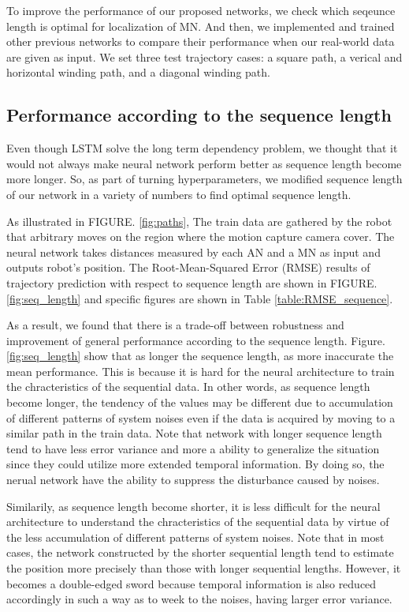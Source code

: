 \documentclass[letterpaper, 10 pt, conference]{ieeeconf}  %
\begin{document}
To improve the performance of our proposed networks, we check which seqeunce length is optimal for localization of MN. And then, we implemented and trained other previous networks to compare their performance when our real-world data are given as input. We set three test trajectory cases: a square path, a verical and horizontal winding path, and a diagonal winding path. 

\subsection{Performance according to the sequence length}

Even though LSTM solve the long term dependency problem, we thought that it would not always make neural network perform better as sequence length become more longer. So, as part of turning hyperparameters, we modified sequence length of our network in a variety of numbers to find optimal sequence length.   

As illustrated in FIGURE. \ref{fig:paths}, The train data are gathered by the robot that arbitrary moves on the region where the motion capture camera cover. The neural network takes distances measured by each AN and a MN as input and outputs robot's position. The Root-Mean-Squared Error (RMSE) results of trajectory prediction with respect to sequence length are shown in FIGURE. \ref{fig:seq_length} and specific figures are shown in Table \ref{table:RMSE_sequence}.

As a result, we found that there is a trade-off between robustness and improvement of general performance according to the sequence length. Figure. \ref{fig:seq_length} show that as longer the sequence length, as more inaccurate the mean performance. This is because it is hard for the neural architecture to train the chracteristics of the sequential data. In other words, as sequence length become longer, the tendency of the values may be different due to accumulation of different patterns of system noises even if the data is acquired by moving to a similar path in the train data. Note that network with longer sequence length tend to have less error variance and more a ability to generalize the situation since they could utilize more extended temporal information. By doing so, the nerual network have the ability to suppress the disturbance caused by noises.

Similarily, as sequence length become shorter, it is less difficult for the neural architecture to understand the chracteristics of the sequential data by virtue of the less accumulation of different patterns of system noises. Note that in most cases, the network constructed by the shorter sequential length tend to estimate the position more precisely than those with longer sequential lengths. However, it becomes a double-edged sword because temporal information is also reduced accordingly in such a way as to week to the noises, having larger error variance.
\end{document}
